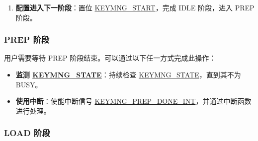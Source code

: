 \documentclass[main\_\_CN.tex]{subfiles}
\begin{document}
\begin{enumerate}
\begin{itemize}
        \item 3: flash\_256\_1\_key
        \item 4: flash\_256\_2\_key
        \item 5: flash\_128\_key
        \item 6: hmac\_key
        \item 7: ds\_key
        \item 8: psram\_256\_1\_key
        \item 9: psram\_256\_2\_key
        \item 10: psram\_128\_key
        \item 11: ecdsa\_key\_384\_l
        \item 12: ecdsa\_key\_384\_h
        \item 其他值：无效
    \end{itemize}
    \item \textbf{配置进入下一阶段}：置位 \hyperref[fielddesc:KEYMNGSTART]{KEYMNG\_START}，完成 IDLE 阶段，进入 PREP 阶段。
\end{enumerate}

\subsubsection{PREP 阶段}

用户需要等待 PREP 阶段结束。可以通过以下任一方式完成此操作：
\begin{itemize}
    \item \textbf{监测 \hyperref[fielddesc:KEYMNGSTATE]{KEYMNG\_STATE}}：持续检查 \hyperref[fielddesc:KEYMNGSTATE]{KEYMNG\_STATE}，直到其不为 BUSY。
    \item \textbf{使用中断}：使能中断信号 \hyperref[int:KEYMNGPREPDONEINT]{KEYMNG\_PREP\_DONE\_INT}，并通过中断函数进行处理。
\end{itemize}

\subsubsection{LOAD 阶段}
\end{document}

